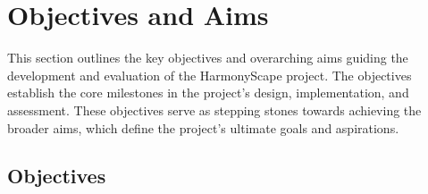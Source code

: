 \documentclass{l4proj}
\begin{document}




\section{Objectives and Aims}
This section outlines the key objectives and overarching aims guiding the development and evaluation of the HarmonyScape project. The objectives establish the core milestones in the project's design, implementation, and assessment. These objectives serve as stepping stones towards achieving the broader aims, which define the project's ultimate goals and aspirations.

\subsection{Objectives}
\end{document}
